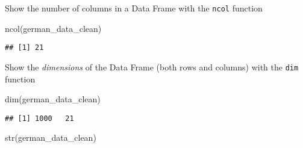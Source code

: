 \documentclass[
]{article}
\newenvironment{Shaded}{\begin{snugshade}}{\end{snugshade}}
\newcommand{\FunctionTok}[1]{\textcolor[rgb]{0.00,0.00,0.00}{#1}}
\newcommand{\NormalTok}[1]{#1}
\begin{document}
Show the number of columns in a Data Frame with the \texttt{ncol}
function

\begin{Shaded}
\begin{Highlighting}[]
\FunctionTok{ncol}\NormalTok{(german\_data\_clean)}
\end{Highlighting}
\end{Shaded}

\begin{verbatim}
## [1] 21
\end{verbatim}

Show the \emph{dimensions} of the Data Frame (both rows and columns)
with the \texttt{dim} function

\begin{Shaded}
\begin{Highlighting}[]
\FunctionTok{dim}\NormalTok{(german\_data\_clean)}
\end{Highlighting}
\end{Shaded}

\begin{verbatim}
## [1] 1000   21
\end{verbatim}

\begin{Shaded}
\begin{Highlighting}[]
\FunctionTok{str}\NormalTok{(german\_data\_clean)}
\end{Highlighting}
\end{Shaded}
\end{document}
